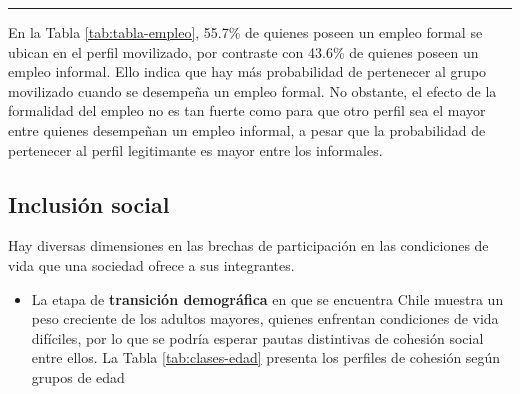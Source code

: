 \documentclass[
  12pt,
]{book}
\providecommand{\tightlist}{%
  \setlength{\itemsep}{0pt}\setlength{\parskip}{0pt}}
\begin{document}
\begin{center}\rule{0.5\linewidth}{0.5pt}\end{center}

En la Tabla \ref{tab:tabla-empleo}, 55.7\% de quienes poseen un empleo formal se ubican en el perfil movilizado, por contraste con 43.6\% de quienes poseen un empleo informal. Ello indica que hay más probabilidad de pertenecer al grupo movilizado cuando se desempeña un empleo formal. No obstante, el efecto de la formalidad del empleo no es tan fuerte como para que otro perfil sea el mayor entre quienes desempeñan un empleo informal, a pesar que la probabilidad de pertenecer al perfil legitimante es mayor entre los informales.

\hypertarget{inclusiuxf3n-social}{%
\subsection{Inclusión social}\label{inclusiuxf3n-social}}

Hay diversas dimensiones en las brechas de participación en las condiciones de vida que una sociedad ofrece a sus integrantes.

\begin{itemize}
\tightlist
\item
  La etapa de \textbf{transición demográfica} en que se encuentra Chile muestra un peso creciente de los adultos mayores, quienes enfrentan condiciones de vida difíciles, por lo que se podría esperar pautas distintivas de cohesión social entre ellos. La Tabla \ref{tab:clases-edad} presenta los perfiles de cohesión según grupos de edad
\end{itemize}

\begin{table}

\caption{\label{tab:clases-edad}Efecto de la edad sobre los perfiles de cohesión social en porcentaje}
\centering
{}
\end{table}
\end{document}
